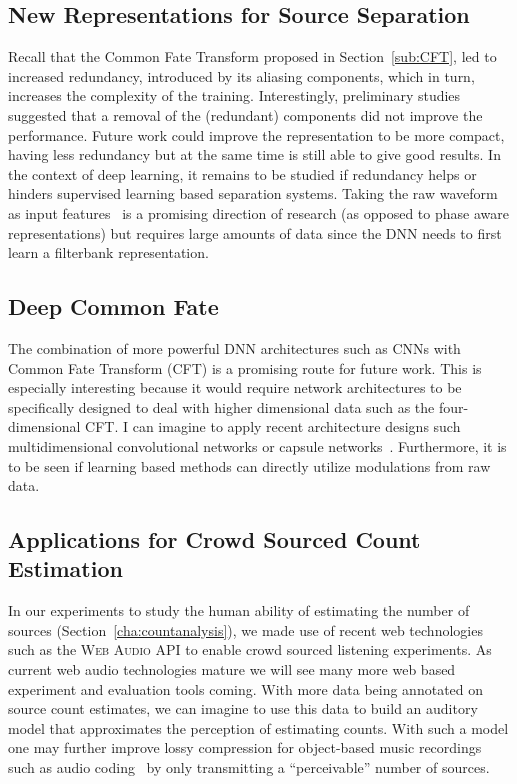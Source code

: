 \subsection*{New Representations for Source Separation}

Recall that the Common Fate Transform proposed in Section~\ref{sub:CFT}, led to  increased redundancy, introduced by its aliasing components, which in turn, increases the complexity of the training.
Interestingly, preliminary studies suggested that a removal of the (redundant) components did not improve the performance.
Future work could improve the representation to be more compact, having less redundancy but at the same time is still able to give good results.
In the context of deep learning, it remains to be studied if redundancy helps or hinders supervised learning based separation systems.
Taking the raw waveform as input features~\cite{Dieleman14, oord16} is a promising direction of research (as opposed to phase aware representations) but requires large amounts of data since the DNN needs to first learn a filterbank representation.

\subsection*{Deep Common Fate}

The combination of more powerful DNN architectures such as CNNs with Common Fate Transform (CFT) is a promising route for future work. 
This is especially interesting because it would require network architectures to be specifically designed to deal with higher dimensional data such as the four-dimensional CFT. I can imagine to apply recent architecture designs such multidimensional convolutional networks or capsule networks~\cite{sabour17}. 
Furthermore, it is to be seen if learning based methods can directly utilize modulations from raw data.

\subsection*{Applications for Crowd Sourced Count Estimation}

In our experiments to study the human ability of estimating the number of sources (Section~\ref{cha:countanalysis}), we made use of recent web technologies such as the \textsc{Web Audio API} to enable crowd sourced listening experiments. As current web audio technologies mature we will see many more web based experiment and evaluation tools coming.
With more data being annotated on source count estimates, we can imagine to use this data to build an auditory model that approximates the perception of estimating counts.
With such a model one may further improve lossy compression for object-based music recordings such as audio coding~\cite{herre12} by only transmitting a ``perceivable'' number of sources.

